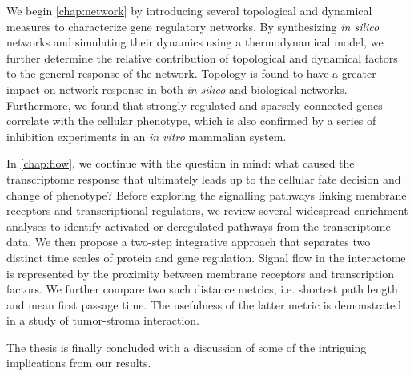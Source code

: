 We begin \ref{chap:network} by introducing several 
topological and dynamical measures to characterize gene
regulatory networks. By synthesizing \emph{in silico}
networks and simulating their dynamics using a 
thermodynamical model,
we further determine the relative
contribution of topological and dynamical factors to the 
general response of the network. Topology is found to have
a greater impact on network response in both \emph{in silico}
and biological networks. Furthermore, we found that strongly
regulated and sparsely connected genes correlate with the
cellular phenotype, which is also confirmed by a series
of inhibition experiments in an \emph{in vitro} mammalian
system.

In \ref{chap:flow}, we continue with the question in mind:
what caused the transcriptome response that ultimately leads
up to the cellular fate decision and change of phenotype?
Before exploring the signalling pathways linking membrane
receptors and transcriptional regulators, we review several
widespread enrichment analyses to identify activated or
deregulated pathways from the transcriptome data. We then
propose a two-step integrative approach that separates two distinct 
time scales of protein and gene regulation. 
Signal flow in the interactome is represented by the 
proximity between membrane receptors and transcription 
factors. We further compare two such distance metrics, i.e.
shortest path length and mean first passage time. The
usefulness of the latter metric is demonstrated in a study of
tumor-stroma interaction.

The thesis is finally concluded with a discussion of some
of the intriguing implications from our results.
